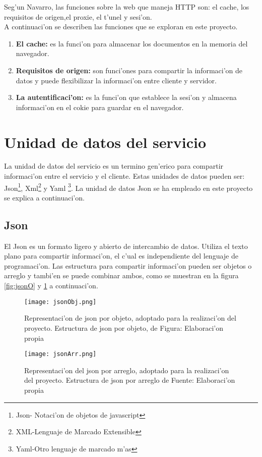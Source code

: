 Seg'un Navarro, las funciones sobre la web que maneja HTTP son: el cache, los requisitos de origen,el proxie, el t'unel y sesi'on. \\

A continuaci'on se describen las funciones que se exploran en este proyecto.
\begin{enumerate}
\item \textbf{El cache:} es la funci'on para almacenar los documentos en la memoria del navegador. 
\item \textbf{ Requisitos de origen:} son funci'ones para compartir la informaci'on de datos y puede flexibilizar la informaci'on entre cliente y servidor. 
\item \textbf{La autentificaci'on:} es la funci'on que establece la sesi'on y almacena informaci'on en el cokie para guardar en el navegador. 
\end{enumerate}

\section{Unidad de datos del servicio}
La unidad de datos del servicio es un termino gen'erico para compartir informaci'on entre el servicio y el cliente. Estas unidades de datos pueden ser: Json\footnote{Json- Notaci'on de objetos de javascript}, Xml\footnote{XML-Lenguaje de Marcado Extensible} y Yaml \footnote{Yaml-Otro lenguaje de marcado m'as}. La unidad de datos Json se ha empleado en este proyecto se explica a continuaci'on.

\subsection{Json}
El Json es un formato ligero y abierto de intercambio de datos. Utiliza  el texto plano para compartir informaci'on, el c'ual es  independiente del lenguaje de programaci'on.  
Las estructura para compartir informaci'on pueden ser objetos o arreglo y tambi'en se puede combinar ambos, como se muestran en la figura \ref{fig:jsonO} y \ref{fig:jsonA} a continuaci'on.

\begin{figure}[H]
\begin{minipage}{0.48\textwidth}
\centering
\texttt{[image: jsonObj.png]}
\captionsetup{justification=centering,margin=2cm}
\caption{Representaci'on de json por objeto, adoptado para la realizaci'on del proyecto. Estructura de json por objeto, de Figura: Elaboraci'on propia}
\label{fig:jsonO}
\end{minipage}\hfill
\begin {minipage}{0.48\textwidth}
\centering
\texttt{[image: jsonArr.png]}
\captionsetup{justification=centering,margin=2cm}
\caption{Representaci'on del json por arreglo, adoptado para la realizaci'on del proyecto. Estructura de json por arreglo de Fuente: Elaboraci'on propia}
\label{fig:jsonA}
\end{minipage}
\end{figure}

